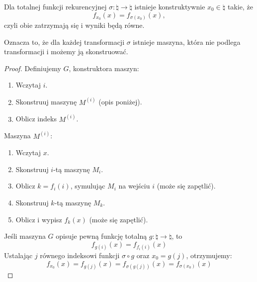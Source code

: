 \newpage
\begin{theorem}
    Dla totalnej funkcji rekurencyjnej \(\sigma: \natural \to \natural\) istnieje konstruktywnie \(x_0 \in \natural\) takie, że 
    \[ f_{x_0}(x) = f_{\sigma(x_0)}(x), \]
    czyli obie zatrzymają się i wyniki będą równe.
\end{theorem}
Oznacza to, że dla każdej transformacji \(\sigma\) istnieje maszyna, która nie podlega transformacji i możemy ją skonstruować.
\begin{proof}
    Definiujemy \(G\), konstruktora maszyn:
    \begin{enumerate}
    \singlespacing
        \item Wczytaj \(i\).
        \item Skonstruuj maszynę \(M^{(i)}\) (opis poniżej).
        \item Oblicz indeks \(M^{(i)}\).
    \end{enumerate}
    Maszyna \(M^{(i)}\):
    \begin{enumerate}
    \singlespacing
        \item Wczytaj \(x\).
        \item Skonstruuj \(i\)-tą maszynę \(M_i\).
        \item Oblicz \(k = f_i(i)\), symulując \(M_i\) na wejściu \(i\) (może się zapętlić).
        \item Skonstruuj \(k\)-tą maszynę \(M_k\).
        \item Oblicz i wypisz \(f_k(x)\) (może się zapętlić).
    \end{enumerate}
    
    Jeśli maszyna \(G\) opisuje pewną funkcję totalną \(g: \natural \to \natural\), to
    \[ f_{g(i)}(x) = f_{f_i(i)}(x) \]
    Ustalając \(j\) równego indeksowi funkcji \(\sigma \circ g \) oraz \(x_0 = g(j)\), otrzymujemy:
    \[ f_{x_0}(x) = f_{g(j)}(x) = f_{\sigma(g(j))}(x) = f_{\sigma(x_0)}(x) \]
\end{proof}